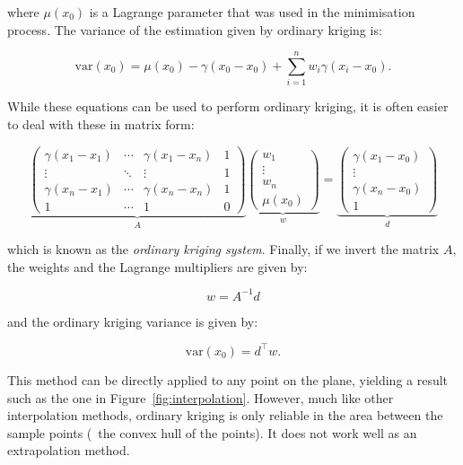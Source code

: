 where \(\mu(x_0)\) is a Lagrange parameter that was used in the minimisation process.
The variance of the estimation given by ordinary kriging is:

\begin{equation}
\mathrm{var}(x_0) = \mu(x_0) - \gamma(x_0 - x_0) + \sum_{i=1}^n w_i \gamma(x_i-x_0).
\end{equation}

While these equations can be used to perform ordinary kriging, it is often easier to deal with these in matrix form:

\begin{equation}
%
\underbrace{\left( \begin{array}{cccc}
\gamma(x_1-x_1) & \cdots & \gamma(x_1-x_n) & 1 \\
\vdots & \ddots & \vdots & 1 \\
\gamma(x_n-x_1) & \cdots & \gamma(x_n-x_n) & 1 \\
1 & \cdots & 1 & 0 \end{array} \right)}_{A}
%
\underbrace{\left(\begin{array}{c}
w_1 \\
\vdots \\
w_n \\
\mu(x_0) \end{array} \right)}_{w} = 
%
\underbrace{\left(\begin{array}{c}
\gamma(x_1-x_0) \\
\vdots \\
\gamma(x_n-x_0) \\
1 \end{array} \right)}_{d}
\end{equation}

which is known as the \emph{ordinary kriging system}.
Finally, if we invert the matrix \(A\), the weights and the Lagrange multipliers are given by:

\begin{equation}
w = A^{-1}d
\end{equation}

and the ordinary kriging variance is given by:

\begin{equation}
\mathrm{var}(x_0) = d^\top w.
\end{equation}

This method can be directly applied to any point on the plane, yielding a result such as the one in Figure~\ref{fig:interpolation}.
However, much like other interpolation methods, ordinary kriging is only reliable in the area between the sample points (\ie\ the convex hull of the points).
It does not work well as an extrapolation method.

